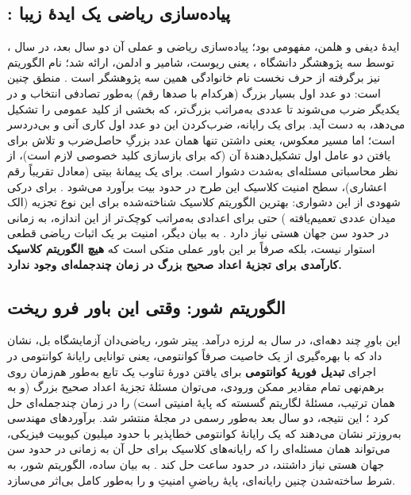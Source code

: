 \subsection{: پیاده‌سازی ریاضی یک ایدهٔ زیبا}

ایدهٔ دیفی و هلمن، مفهومی بود؛ پیاده‌سازی ریاضی و عملی آن دو سال بعد، در سال ، توسط سه پژوهشگر دانشگاه ، یعنی ریوست، شامیر و ادلمن، ارائه شد؛ نام الگوریتم  نیز برگرفته از حرف نخست نام خانوادگی همین سه پژوهشگر است \Cite{rsa1978}. منطق  چنین است: دو عدد اول بسیار بزرگ (هرکدام با صدها رقم) به‌طور تصادفی انتخاب و در یکدیگر ضرب می‌شوند تا عددی به‌مراتب بزرگ‌تر، که بخشی از کلید عمومی را تشکیل می‌دهد، به دست آید. برای یک رایانه، ضرب‌کردن این دو عدد اول کاری آنی و بی‌دردسر است؛ اما مسیر معکوس، یعنی داشتن تنها همان عدد بزرگِ حاصل‌ضرب و تلاش برای یافتن دو عامل اول تشکیل‌دهندهٔ آن (که برای بازسازی کلید خصوصی لازم است)، از نظر محاسباتی مسئله‌ای به‌شدت دشوار است. برای یک پیمانهٔ  بیتی (معادل تقریباً  رقم اعشاری)، سطح امنیت کلاسیک این طرح در حدود  بیت برآورد می‌شود \Cite{nistsp800-57}. برای درکی شهودی از این دشواری: بهترین الگوریتم کلاسیک شناخته‌شده برای این نوع تجزیه (الک میدان عددی تعمیم‌یافته ) حتی برای اعدادی به‌مراتب کوچک‌تر از این اندازه، به زمانی در حدود سن جهان هستی نیاز دارد \Cite{bub2006}. به بیان دیگر، امنیت  بر یک اثبات ریاضی قطعی استوار نیست، بلکه صرفاً بر این باور عملی متکی است که \textbf{هیچ الگوریتم کلاسیک کارآمدی برای تجزیهٔ اعداد صحیح بزرگ در زمان چندجمله‌ای وجود ندارد.}

\subsection{الگوریتم شور: وقتی این باور فرو ریخت}

این باورِ چند دهه‌ای، در سال  به لرزه درآمد. پیتر شور، ریاضی‌دان آزمایشگاه بل، نشان داد که با بهره‌گیری از یک خاصیت صرفاً کوانتومی، یعنی توانایی رایانهٔ کوانتومی در اجرای \textbf{تبدیل فوریهٔ کوانتومی}  برای یافتن دورهٔ تناوب یک تابع به‌طور هم‌زمان روی برهم‌نهی تمام مقادیر ممکن ورودی، می‌توان مسئلهٔ تجزیهٔ اعداد صحیح بزرگ (و به همان ترتیب، مسئلهٔ لگاریتم گسسته که پایهٔ امنیتی  است) را در زمان چندجمله‌ای حل کرد \Cite{shor1997}؛ این نتیجه، دو سال بعد به‌طور رسمی در مجلهٔ  منتشر شد. برآوردهای مهندسی به‌روزتر نشان می‌دهند که یک رایانهٔ کوانتومی خطاپذیر با حدود  میلیون کیوبیت فیزیکی، می‌تواند همان مسئله‌ای را که رایانه‌های کلاسیک برای حل آن به زمانی در حدود سن جهان هستی نیاز داشتند، در حدود  ساعت حل کند \Cite{gidneyekera2019}. به بیان ساده، الگوریتم شور، به شرط ساخته‌شدن چنین رایانه‌ای، پایهٔ ریاضیِ امنیتِ  و  را به‌طور کامل بی‌اثر می‌سازد.

